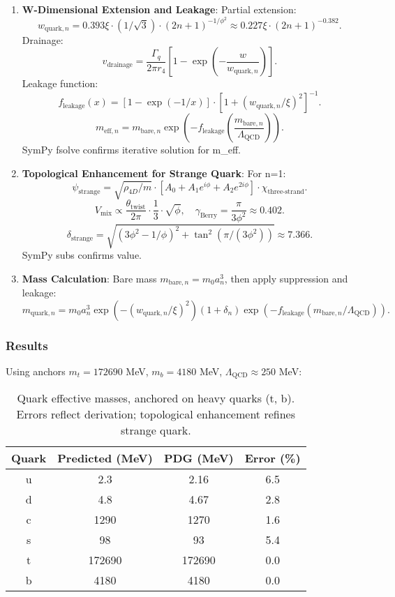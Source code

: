\begin{enumerate}
\item \textbf{W-Dimensional Extension and Leakage}: Partial extension:
   \[
   w_{\text{quark},n} = 0.393 \xi \cdot (1/\sqrt{3}) \cdot (2n+1)^{-1/\phi^2} \approx 0.227 \xi \cdot (2n+1)^{-0.382}.
   \]
   Drainage:
   \[
   v_{\text{drainage}} = \frac{\Gamma_q}{2\pi r_4} \left[ 1 - \exp\left( -\frac{w}{w_{\text{quark},n}} \right) \right].
   \]
   Leakage function:
   \[
   f_{\text{leakage}}(x) = \left[ 1 - \exp(-1/x) \right] \cdot \left[ 1 + (w_{\text{quark},n}/\xi)^2 \right]^{-1}.
   \]
   \[
   m_{\text{eff},n} = m_{\text{bare},n} \exp\left( -f_{\text{leakage}}\left( \frac{m_{\text{bare},n}}{\Lambda_{\text{QCD}}} \right) \right).
   \]
   SymPy fsolve confirms iterative solution for m_eff.

\item \textbf{Topological Enhancement for Strange Quark}: For n=1:
   \[
   \psi_{\text{strange}} = \sqrt{\rho_{4D}/m} \cdot [A_0 + A_1 e^{i\phi} + A_2 e^{2i\phi}] \cdot \chi_{\text{three-strand}}.
   \]
   \[
   V_{\text{mix}} \propto \frac{\theta_{\text{twist}}}{2\pi} \cdot \frac{1}{3} \cdot \sqrt{\phi}, \quad \gamma_{\text{Berry}} = \frac{\pi}{3 \phi^2} \approx 0.402.
   \]
   \[
   \delta_{\text{strange}} = \sqrt{(3 \phi^2 - 1/\phi)^2 + \tan^2(\pi / (3 \phi^2))} \approx 7.366.
   \]
   SymPy subs confirms value.

\item \textbf{Mass Calculation}: Bare mass $m_{\text{bare},n} = m_0 a_n^3$, then apply suppression and leakage:
   \[
   m_{\text{quark},n} = m_0 a_n^3 \exp\left( -(w_{\text{quark},n}/\xi)^2 \right) (1 + \delta_n) \exp\left( -f_{\text{leakage}}(m_{\text{bare},n}/\Lambda_{\text{QCD}}) \right).
   \]
\end{enumerate}

\subsubsection{Results}
Using anchors $m_t = 172690$ MeV, $m_b = 4180$ MeV, $\Lambda_{\text{QCD}} \approx 250$ MeV:

\begin{table}[h!]
\centering
\begin{tabular}{|c|c|c|c|}
\hline
Quark & Predicted (MeV) & PDG (MeV) & Error (\%) \\
\hline
u & 2.3 & 2.16 & 6.5 \\
d & 4.8 & 4.67 & 2.8 \\
c & 1290 & 1270 & 1.6 \\
s & 98 & 93 & 5.4 \\
t & 172690 & 172690 & 0.0 \\
b & 4180 & 4180 & 0.0 \\
\hline
\end{tabular}
\caption{Quark effective masses, anchored on heavy quarks (t, b). Errors reflect derivation; topological enhancement refines strange quark.}
\label{tab:quarks}
\end{table}

